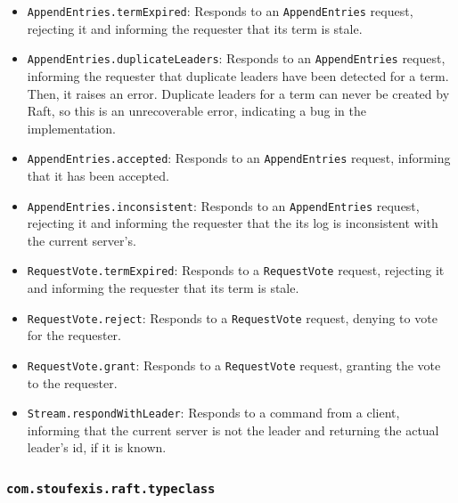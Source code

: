 \begin{itemize}
    \item \lstinline|AppendEntries.termExpired|: Responds to an \lstinline|AppendEntries| request, rejecting it and informing the requester that its term is stale.
    \item \lstinline|AppendEntries.duplicateLeaders|: Responds to an \lstinline|AppendEntries| request, informing the requester that duplicate leaders have been detected for a term. Then, it raises an error. Duplicate leaders for a term can never be created by Raft, so this is an unrecoverable error, indicating a bug in the implementation.
    \item \lstinline|AppendEntries.accepted|: Responds to an \lstinline|AppendEntries| request, informing that it has been accepted.
    \item \lstinline|AppendEntries.inconsistent|: Responds to an \lstinline|AppendEntries| request, rejecting it and informing the requester that the its log is inconsistent with the current server's.
    \item \lstinline|RequestVote.termExpired|: Responds to a \lstinline|RequestVote| request, rejecting it and informing the requester that its term is stale.
    \item \lstinline|RequestVote.reject|: Responds to a \lstinline|RequestVote| request, denying to vote for the requester.
    \item \lstinline|RequestVote.grant|: Responds to a \lstinline|RequestVote| request, granting the vote to the requester.
    \item \lstinline|Stream.respondWithLeader|: Responds to a command from a client, informing that the current server is not the leader and returning the actual leader's id, if it is known.
\end{itemize}

\subsubsection{\lstinline|com.stoufexis.raft.typeclass|}

